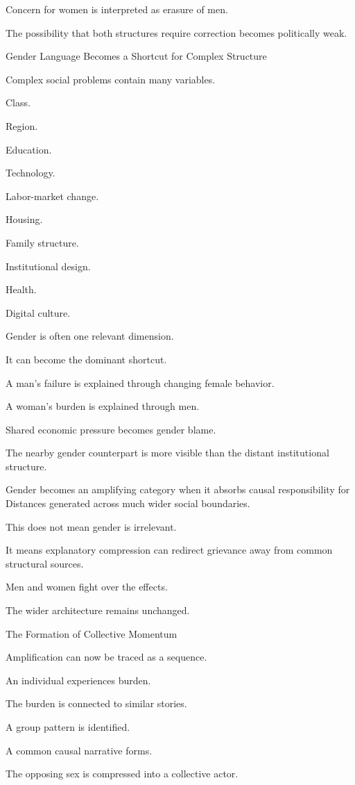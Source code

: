 Concern for women is interpreted as erasure of men.

The possibility that both structures require correction becomes politically weak.

Gender Language Becomes a Shortcut for Complex Structure

Complex social problems contain many variables.

Class.

Region.

Education.

Technology.

Labor-market change.

Housing.

Family structure.

Institutional design.

Health.

Digital culture.

Gender is often one relevant dimension.

It can become the dominant shortcut.

A man’s failure is explained through changing female behavior.

A woman’s burden is explained through men.

Shared economic pressure becomes gender blame.

The nearby gender counterpart is more visible than the distant institutional structure.

Gender becomes an amplifying category when it absorbs causal responsibility for Distances generated across much wider social boundaries.

This does not mean gender is irrelevant.

It means explanatory compression can redirect grievance away from common structural sources.

Men and women fight over the effects.

The wider architecture remains unchanged.

The Formation of Collective Momentum

Amplification can now be traced as a sequence.

An individual experiences burden.

The burden is connected to similar stories.

A group pattern is identified.

A common causal narrative forms.

The opposing sex is compressed into a collective actor.

